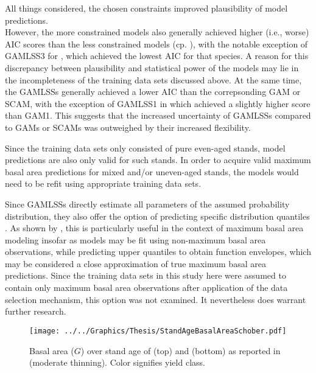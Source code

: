 All things considered, the chosen constraints improved plausibility of model predictions.  \\
However, the more constrained models also generally achieved higher (i.e., worse) AIC scores than the less constrained models (cp. ), with the notable exception of GAMLSS3 for \Spruce{}, which achieved the lowest AIC for that species.  A reason for this discrepancy between plausibility and statistical power of the models may lie in the incompleteness of the training data sets discussed above.  At the same time, the GAMLSSs generally achieved a lower AIC than the correpsonding GAM or SCAM, with the exception of GAMLSS1 in \Spruce{} which achieved a slightly higher score than GAM1.  This suggests that the increased uncertainty of GAMLSSs compared to GAMs or SCAMs was outweighed by their increased flexibility.

Since the training data sets only consisted of pure even-aged stands, model predictions are also only valid for such stands.  In order to acquire valid maximum basal area predictions for mixed and/or uneven-aged stands, the models would need to be refit using appropriate training data sets.

Since GAMLSSs directly estimate all parameters of the assumed probability distribution, they also offer the option of predicting specific distribution quantiles \parencite{Yee2004}.  As shown by \textcite{Woerdehoff2014}, this is particularly useful in the context of maximum basal area modeling insofar as models may be fit using non-maximum basal area observations, while predicting upper quantiles to obtain function envelopes, which may be considered a close approximation of true maximum basal area predictions.  Since the training data sets in this study here were assumed to contain only maximum basal area observations after application of the data selection mechanism, this option was not examined.  It nevertheless does warrant further research.

\begin{figure}[h]
  \centering
  \texttt{[image: ../../Graphics/Thesis/StandAgeBasalAreaSchober.pdf]}
  \caption{Basal area (\(G\)) over stand age of \Beech{} (top) and \Spruce{} (bottom) as reported in \textcite{Schober1995} (moderate thinning).  Color signifies yield class.}
  \label{fig:StandAgeBasalAreaSchober}
\end{figure}


